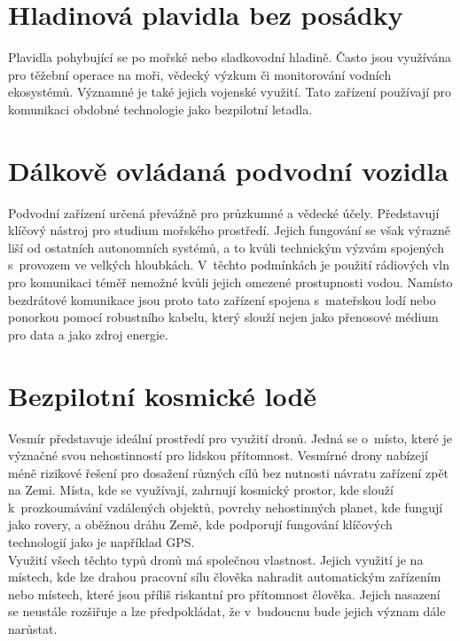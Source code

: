 \documentclass[12pt]{report}
\begin{document}
\section[Hladinová plavidla bez posádky]{Hladinová plavidla bez posádky}
Plavidla pohybující se po mořské nebo sladkovodní hladině. Často jsou využívána pro těžební operace na moři, vědecký výzkum či monitorování vodních ekosystémů. Významné je také jejich vojenské využití. Tato zařízení používají pro komunikaci obdobné technologie jako bezpilotní letadla. \cite{mainbook}

\section[Dálkově ovládaná podvodní vozidla]{Dálkově ovládaná podvodní vozidla}
Podvodní zařízení určená převážně pro průzkumné a vědecké účely. Představují klíčový nástroj pro studium mořského prostředí. Jejich fungování se však výrazně liší od ostatních autonomních systémů, a to kvůli technickým výzvám spojených s~provozem ve velkých hloubkách. V~těchto podmínkách je použití rádiových vln pro komunikaci téměř nemožné kvůli jejich omezené prostupnosti vodou. Namísto bezdrátové komunikace jsou proto tato zařízení spojena s~mateřskou lodí nebo ponorkou pomocí robustního kabelu, který slouží nejen jako přenosové médium pro data a jako zdroj energie. \cite{mainbook}

\section[Bezpilotní kosmické lodě]{Bezpilotní kosmické lodě}
Vesmír představuje ideální prostředí pro využití dronů. Jedná se o~místo, které je význačné svou nehostinností pro lidskou přítomnost. Vesmírné drony nabízejí méně rizikové řešení pro dosažení různých cílů bez nutnosti návratu zařízení zpět na Zemi. Místa, kde se využívají, zahrnují kosmický prostor, kde slouží k~prozkoumávání vzdálených objektů, povrchy nehostinných planet, kde fungují jako rovery, a oběžnou dráhu Země, kde podporují fungování klíčových technologií jako je například GPS. \cite{mainbook}\\

Využití všech těchto typů dronů má společnou vlastnost. Jejich využití je na místech, kde lze drahou pracovní sílu člověka nahradit automatickým zařízením nebo místech, které jsou příliš riskantní pro přítomnost člověka. Jejich nasazení se neustále rozšiřuje a lze předpokládat, že v~budoucnu bude jejich význam dále narůstat.
\end{document}
